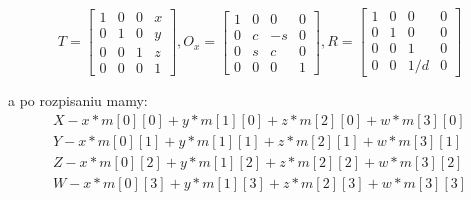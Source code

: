 \begin{equation*}
  T =  \begin{bmatrix}
 1 & 0 & 0 & x\\
 0 & 1 & 0 & y\\
 0 & 0 & 1 & z\\
 0 & 0 & 0 & 1
        \end{bmatrix} ,
  O_x =  \begin{bmatrix}
 1 & 0 & 0 & 0\\
 0 & c & -s & 0\\
 0 & s & c & 0\\
 0 & 0 & 0 & 1
        \end{bmatrix} ,
R =  \begin{bmatrix}
 1 & 0 & 0 & 0\\
 0 & 1 & 0 & 0\\
 0 & 0 & 1 & 0\\
 0 & 0 & 1/d & 0
        \end{bmatrix} 
\end{equation*}

a po rozpisaniu mamy:
\begin{equation*}
\begin{matrix}
  X - x*m[0][0] + y*m[1][0]+z*m[2][0] + w*m[3][0] \\

  Y - x*m[0][1] + y*m[1][1]+z*m[2][1] + w*m[3][1] \\

  Z - x*m[0][2] + y*m[1][2]+z*m[2][2] + w*m[3][2] \\

  W - x*m[0][3] + y*m[1][3]+z*m[2][3] + w*m[3][3]  \\
  \end{matrix}
\end{equation*}

